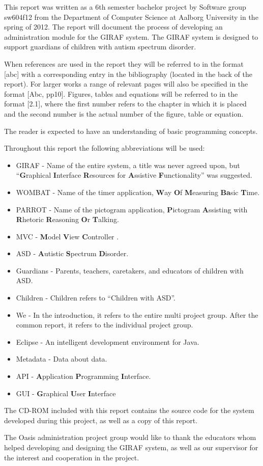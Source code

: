 This report was written as a 6th semester bachelor project by Software group sw604f12 from the Department of Computer Science at Aalborg University in the spring of 2012. The report will document the process of developing an administration module for the GIRAF system. The GIRAF system is designed to support guardians of children with autism spectrum disorder.

When references are used in the report they will be referred to in the format [abc] with a corresponding entry in the bibliography (located in the back of the report). For larger works a range of relevant pages will also be specified in the format [Abc, pp10]. Figures, tables and equations will be referred to in the format [2.1], where the first number refers to the chapter in which it is placed and the second number is the actual number of the figure, table or equation.

The reader is expected to have an understanding of basic programming concepts.

Throughout this report the following abbreviations will be used:

\begin{itemize}
	\item GIRAF - Name of the entire system, a title was never agreed upon, but ``\textbf{G}raphical
	\textbf{I}nterface \textbf{R}esources for \textbf{A}ssistive \textbf{F}unctionality'' was suggested.
	\item WOMBAT - Name of the timer application, \textbf{W}ay \textbf{O}f \textbf{M}easuring \textbf{Ba}sic \textbf{T}ime. 
	\item PARROT - Name of the pictogram application, \textbf{P}ictogram \textbf{A}ssisting with \textbf{R}hetoric \textbf{R}easoning \textbf{O}r \textbf{T}alking.
	\item MVC - \textbf{M}odel \textbf{V}iew \textbf{C}ontroller \cite{MVC}.
	\item ASD - \textbf{A}utistic \textbf{S}pectrum \textbf{D}isorder.
	\item Guardians - Parents, teachers, caretakers, and educators of children with ASD.
	\item Children - Children refers to ``Children with ASD''.
	\item We - In the introduction, it refers to the entire multi project group. After the common report, it refers to the individual project group.
	\item Eclipse - An intelligent development environment for Java.
	\item Metadata - Data about data.
	\item API - \textbf{A}pplication \textbf{P}rogramming \textbf{I}nterface.
	\item GUI - \textbf{G}raphical \textbf{U}ser \textbf{I}nterface
\end{itemize}


The CD-ROM included with this report contains the source code for the system developed during this project, as well as a copy of this report.

The Oasis administration project group would like to thank the educators whom helped developing and designing the GIRAF system, as well as our supervisor for the interest and cooperation in the project.